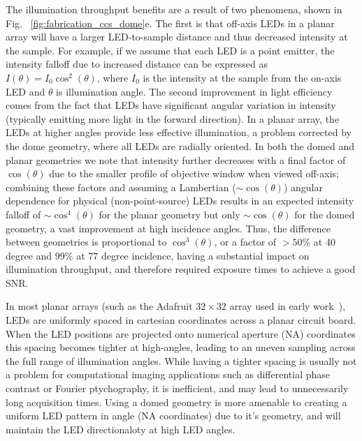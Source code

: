 The illumination throughput benefits are a result of two phenomena, shown in Fig. ~\ref{fig:fabrication_ccs_dome}e. The first is that off-axis LEDs in a planar array will have a larger LED-to-sample distance and thus decreased intensity at the sample. For example, if we assume that each LED is a point emitter, the intensity falloff due to increased distance can be expressed as $I(\theta) = I_0 \cos^2(\theta)$, where $I_0$ is the intensity at the sample from the on-axis LED and $\theta$ is illumination angle. The second improvement in light efficiency comes from the fact that LEDs have significant angular variation in intensity (typically emitting more light in the forward direction). In a planar array, the LEDs at higher angles provide less effective illumination, a problem corrected by the dome geometry, where all LEDs are radially oriented. In both the domed and planar geometries we note that intensity further decreases with a final factor of $\cos(\theta)$ due to the smaller profile of objective window when viewed off-axis; combining these factors and assuming a Lambertian ($\sim\cos(\theta)$) angular dependence for physical (non-point-source) LEDs results in an expected intensity falloff of $\sim\cos^4(\theta)$ for the planar geometry but only $\sim\cos(\theta)$ for the domed geometry, a vast improvement at high incidence angles. Thus, the difference between geometries is proportional to $\cos^{3}(\theta)$, or a factor of $> 50 \%$ at 40 degree and $99\%$ at 77 degree incidence, having a substantial impact on illumination throughput, and therefore required exposure times to achieve a good SNR.

In most planar arrays (such as the Adafruit $32 \times 32$ array used in early work~\cite{Zheng2013, Zheng2011}), LEDs are uniformly spaced in cartesian coordinates across a planar circuit board. When the LED positions are projected onto numerical aperture (NA) coordinates this spacing becomes tighter at high-angles, leading to an uneven sampling across the full range of illumination angles. While having a tighter spacing is usually not a problem for computational imaging applications such as differential phase contrast or Fourier ptychography, it is inefficient, and may lead to unnecessarily long acquisition times. Using a domed geometry is more amenable to creating a uniform LED pattern in angle (NA coordinates) due to it's geometry, and will maintain the LED directionaloty at high LED angles.

